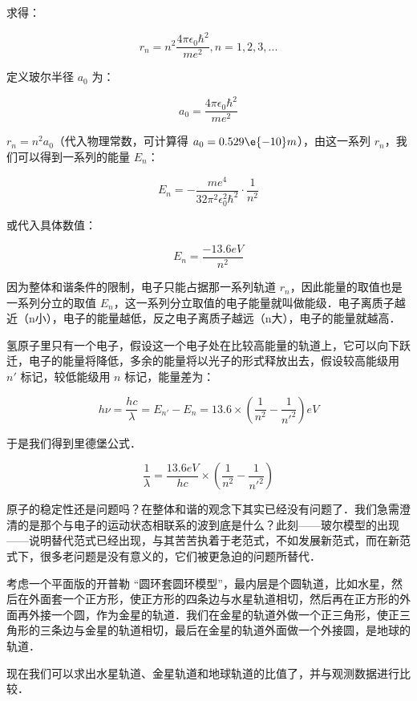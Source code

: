 求得：

\begin{equation}
r_n = n^2 \frac{4 \pi \epsilon_0 \hbar^2  }{ m e^2}, n = 1, 2, 3, ...
\end{equation}

定义玻尔半径 $a_0$ 为：

\begin{equation}
a_0 = \frac{4 \pi \epsilon_0 \hbar^2  }{ m e^2}
\end{equation}

$r_n = n^2 a_0$（代入物理常数，可计算得 $a_0 = 0.529\e{-10} m$），由这一系列 $r_n$，我们可以得到一系列的能量 $E_n$：

\begin{equation}
E_n = - \frac{m e^4 }{ 32 \pi^2 \epsilon_0^2 \hbar^2 } \cdot {\frac{1}{n^2}}
\end{equation}

或代入具体数值：

\begin{equation}
E_n = \frac{-13.6 eV}{n^2}
\end{equation}

因为整体和谐条件的限制，电子只能占据那一系列轨道 $r_n$，因此能量的取值也是一系列分立的取值 $E_n$，这一系列分立取值的电子能量就叫做能级．电子离质子越近（n小），电子的能量越低，反之电子离质子越远（n大），电子的能量就越高．

氢原子里只有一个电子，假设这一个电子处在比较高能量的轨道上，它可以向下跃迁，电子的能量将降低，多余的能量将以光子的形式释放出去，假设较高能级用 $n'$ 标记，较低能级用 $n$ 标记，能量差为：

\begin{equation}
h \nu = \frac{hc}{\lambda} = E_{n'} - E_n = 13.6 \times \left( \frac{1}{n^2}  - \frac{1}{n'^2} \right) eV 
\end{equation}

于是我们得到里德堡公式．

\begin{equation}
\frac{1}{\lambda } = \frac{13.6 eV}{hc} \times \left( \frac{1}{n^2}  - \frac{1}{n'^2} \right)
\end{equation}

原子的稳定性还是问题吗？在整体和谐的观念下其实已经没有问题了．我们急需澄清的是那个与电子的运动状态相联系的波到底是什么？此刻——玻尔模型的出现——说明替代范式已经出现，与其苦苦执着于老范式，不如发展新范式，而在新范式下，很多老问题是没有意义的，它们被更急迫的问题所替代．

\begin{exercise}{}
考虑一个平面版的开普勒 “圆环套圆环模型”，最内层是个圆轨道，比如水星，然后在外面套一个正方形，使正方形的四条边与水星轨道相切，然后再在正方形的外面再外接一个圆，作为金星的轨道．我们在金星的轨道外做一个正三角形，使正三角形的三条边与金星的轨道相切，最后在金星的轨道外面做一个外接圆，是地球的轨道．

现在我们可以求出水星轨道、金星轨道和地球轨道的比值了，并与观测数据进行比较．
\end{exercise}

